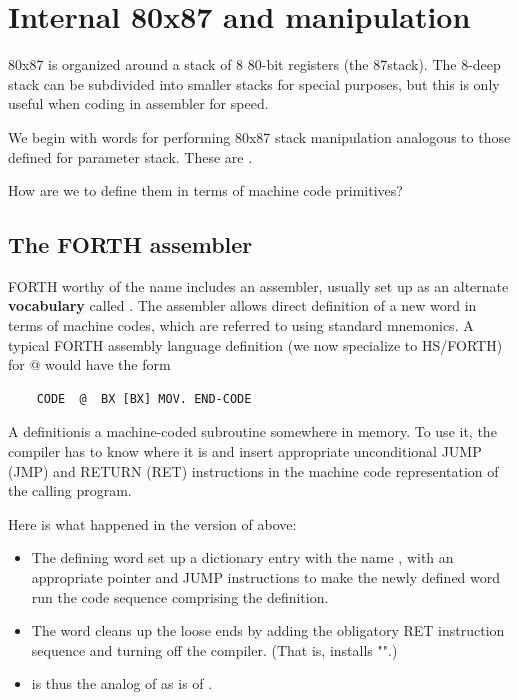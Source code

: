\section{Internal 80x87 and manipulation} 
 80x87 is organized around a stack of 8 80-bit registers (the 87stack). The 8-deep stack can be subdivided into smaller stacks for special purposes, but this is only useful when coding in assembler for speed.

We begin with words for performing 80x87 stack manipulation analogous to those defined for parameter stack. These are .

How are we to define them in terms of machine code primitives?

\subsection{The FORTH assembler}

 FORTH worthy of the name includes an assembler, usually set up as an alternate \textbf{vocabulary} called . The assembler allows direct definition of a new word in terms of machine codes, which are referred to using standard mnemonics. A typical FORTH assembly language definition (we now specialize to HS/FORTH) for @ would have the form

\begin{lstlisting}
    CODE  @  BX [BX] MOV. END-CODE
\end{lstlisting}

A  definitionis a machine-coded subroutine somewhere in memory. To use it, the compiler has to know where it is and insert appropriate unconditional JUMP (JMP) and RETURN (RET) instructions in the machine code representation of the calling program.

Here is what happened in the  version of  above:

\begin{itemize}
    \item The defining word  set up a dictionary entry with the name , with an appropriate pointer and JUMP instructions to make the newly defined word run the code sequence comprising the definition.
    \item The word  cleans up the loose ends by adding the obligatory RET instruction sequence and turning off the compiler. (That is,  installs "".)
    \item {} is thus the analog of \bc{;} as  is of \bc{:}.
\end{itemize}


